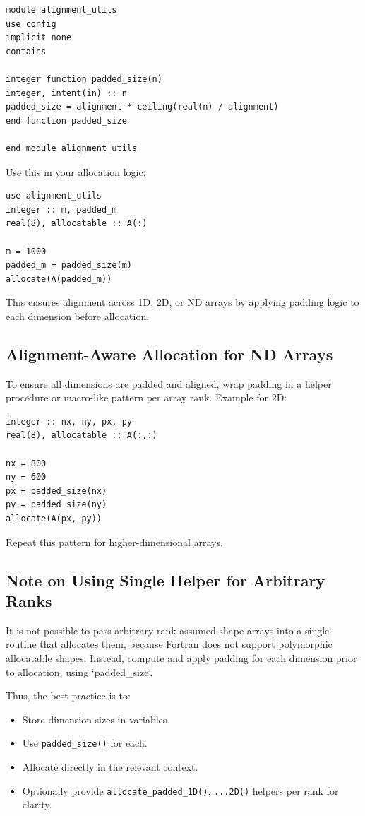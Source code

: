 \documentclass{article}
\begin{document}
\begin{verbatim}
module alignment_utils
use config
implicit none
contains

integer function padded_size(n)
integer, intent(in) :: n
padded_size = alignment * ceiling(real(n) / alignment)
end function padded_size

end module alignment_utils
\end{verbatim}

Use this in your allocation logic:

\begin{verbatim}
use alignment_utils
integer :: m, padded_m
real(8), allocatable :: A(:)

m = 1000
padded_m = padded_size(m)
allocate(A(padded_m))
\end{verbatim}

This ensures alignment across 1D, 2D, or ND arrays by applying padding logic to each dimension before allocation.

\subsection{Alignment-Aware Allocation for ND Arrays}

To ensure all dimensions are padded and aligned, wrap padding in a helper procedure or macro-like pattern per array rank. Example for 2D:

\begin{verbatim}
integer :: nx, ny, px, py
real(8), allocatable :: A(:,:)

nx = 800
ny = 600
px = padded_size(nx)
py = padded_size(ny)
allocate(A(px, py))
\end{verbatim}

Repeat this pattern for higher-dimensional arrays.

\subsection{Note on Using Single Helper for Arbitrary Ranks}

It is not possible to pass arbitrary-rank assumed-shape arrays into a single routine that allocates them, because Fortran does not support polymorphic allocatable shapes. Instead, compute and apply padding for each dimension prior to allocation, using `padded\_size`.

Thus, the best practice is to:
\begin{itemize}
\item Store dimension sizes in variables.
\item Use \texttt{padded\_size()} for each.
\item Allocate directly in the relevant context.
\item Optionally provide \texttt{allocate\_padded\_1D()}, \texttt{...2D()} helpers per rank for clarity.
\end{itemize}
\end{document}
